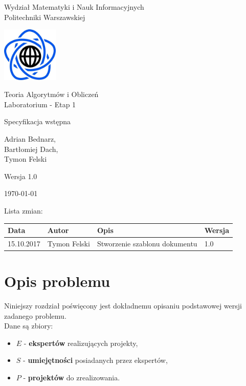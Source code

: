 \documentclass[12pt,a4paper]{article}
\theoremstyle{definition}
\begin{document}
\begin{titlepage}
	\centering
	{\Large Wydział Matematyki i Nauk Informacyjnych\\Politechniki Warszawskiej \par}
	\vspace{1cm}
	\includegraphics[width=0.2\textwidth]{res/img/logo.png} \par
	\vspace{4cm}
	{\LARGE Teoria Algorytmów i Obliczeń\\Laboratorium - Etap 1 \par}
	\vspace{0.5cm}
	{\LARGE Specyfikacja wstępna \par}
	\vspace{2cm}
	{\large Adrian Bednarz,\\Bartłomiej Dach,\\Tymon Felski \par}
	\vspace{2cm}
	{\large Wersja 1.0 \par}
	\vspace{0.5cm}
	{\large \today \par}
\end{titlepage}

\noindent
Lista zmian:\\[.5\baselineskip]
\begin{tabularx}{\textwidth}{|l|l|X|l|}
	\hline
	\textbf{Data} & \textbf{Autor} & \textbf{Opis} & \textbf{Wersja} \\
	\hline
	15.10.2017 & Tymon Felski & Stworzenie szablonu dokumentu & 1.0 \\
	\hline
\end{tabularx}

\newpage
\tableofcontents
\newpage

\section{Opis problemu}
\label{sec:description}
Niniejszy rozdział poświęcony jest dokładnemu opisaniu podstawowej wersji zadanego problemu.\\

\noindent
Dane są zbiory:
\begin{itemize}
	\item $E$ - \textbf{ekspertów} realizujących projekty,
	\item $S$ - \textbf{umiejętności} posiadanych przez ekspertów,
	\item $P$ - \textbf{projektów} do zrealizowania.\\
\end{itemize}
\end{document}
